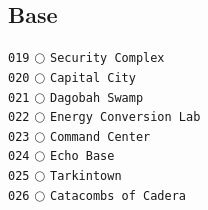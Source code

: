 \documentclass[a4paper,landscape]{article}
\begin{document}
\begin{multicols*}{5}
\section{Base} 
\vspace{-2mm} 
\texttt{019} \(\bigcirc\)  \texttt{Security Complex} \vspace{-0.3mm}\\ 
\texttt{020} \(\bigcirc\)  \texttt{Capital City} \vspace{-0.3mm}\\ 
\texttt{021} \(\bigcirc\)  \texttt{Dagobah Swamp} \vspace{-0.3mm}\\ 
\texttt{022} \(\bigcirc\)  \texttt{Energy Conversion Lab} \vspace{-0.3mm}\\ 
\texttt{023} \(\bigcirc\)  \texttt{Command Center} \vspace{-0.3mm}\\ 
\texttt{024} \(\bigcirc\)  \texttt{Echo Base} \vspace{-0.3mm}\\ 
\texttt{025} \(\bigcirc\)  \texttt{Tarkintown} \vspace{-0.3mm}\\ 
\texttt{026} \(\bigcirc\)  \texttt{Catacombs of Cadera} \vspace{-0.3mm}\\ 

\end{multicols*}
\end{document}

